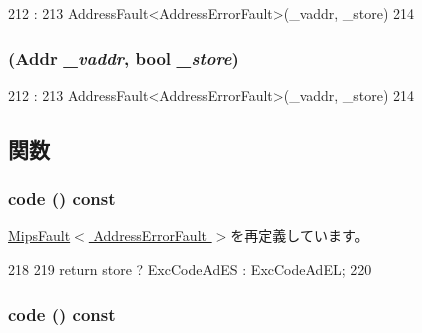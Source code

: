 \begin{DoxyCode}
212                                                 :
213         AddressFault<AddressErrorFault>(_vaddr, _store)
214     {}

\end{DoxyCode}
\hypertarget{classMipsISA_1_1AddressErrorFault_a63571998d6c69ae9fc079f7bded37b9d}{
\subsubsection[{AddressErrorFault}]{ ({\bf Addr} {\em \_\-vaddr}, \/  bool {\em \_\-store})}}
\label{classMipsISA_1_1AddressErrorFault_a63571998d6c69ae9fc079f7bded37b9d}



\begin{DoxyCode}
212                                                 :
213         AddressFault<AddressErrorFault>(_vaddr, _store)
214     {}

\end{DoxyCode}


\subsection{関数}
\hypertarget{classMipsISA_1_1AddressErrorFault_a1dd20a2460d7723d3eaa287b7cc07e79}{
\subsubsection[{code}]{ code () const}}
\label{classMipsISA_1_1AddressErrorFault_a1dd20a2460d7723d3eaa287b7cc07e79}


\hyperlink{classMipsISA_1_1MipsFault_a1dd20a2460d7723d3eaa287b7cc07e79}{MipsFault$<$ AddressErrorFault $>$}を再定義しています。


\begin{DoxyCode}
218     {
219         return store ? ExcCodeAdES : ExcCodeAdEL;
220     }
\end{DoxyCode}
\hypertarget{classMipsISA_1_1AddressErrorFault_a1dd20a2460d7723d3eaa287b7cc07e79}{
\subsubsection[{code}]{ code () const}}
\label{classMipsISA_1_1AddressErrorFault_a1dd20a2460d7723d3eaa287b7cc07e79}


